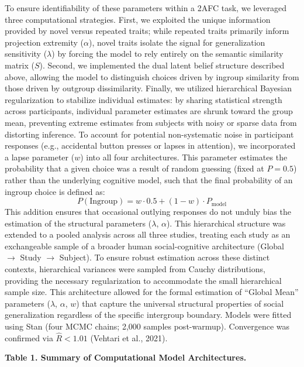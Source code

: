 \documentclass[
  man,
  longtable,
  nolmodern,
  notxfonts,
  notimes,
  man]{apa7}
\begin{document}
To ensure identifiability of these parameters within a 2AFC task, we
leveraged three computational strategies. First, we exploited the unique
information provided by novel versus repeated traits; while repeated
traits primarily inform projection extremity (\(\alpha\)), novel traits
isolate the signal for generalization sensitivity (\(\lambda\)) by
forcing the model to rely entirely on the semantic similarity matrix
(\(S\)). Second, we implemented the dual latent belief structure
described above, allowing the model to distinguish choices driven by
ingroup similarity from those driven by outgroup dissimilarity. Finally,
we utilized hierarchical Bayesian regularization to stabilize individual
estimates: by sharing statistical strength across participants,
individual parameter estimates are shrunk toward the group mean,
preventing extreme estimates from subjects with noisy or sparse data
from distorting inference. To account for potential non-systematic noise
in participant responses (e.g., accidental button presses or lapses in
attention), we incorporated a lapse parameter (\(w\)) into all four
architectures. This parameter estimates the probability that a given
choice was a result of random guessing (fixed at \(P = 0.5\)) rather
than the underlying cognitive model, such that the final probability of
an ingroup choice is defined as:
\[P(\text{Ingroup}) = w \cdot 0.5 + (1 - w) \cdot P_{\text{model}}\]
This addition ensures that occasional outlying responses do not unduly
bias the estimation of the structural parameters (\(\lambda\),
\(\alpha\)). This hierarchical structure was extended to a pooled
analysis across all three studies, treating each study as an
exchangeable sample of a broader human social-cognitive architecture
(Global \(\rightarrow\) Study \(\rightarrow\) Subject). To ensure robust
estimation across these distinct contexts, hierarchical variances were
sampled from Cauchy distributions, providing the necessary
regularization to accommodate the small hierarchical sample size. This
architecture allowed for the formal estimation of ``Global Mean''
parameters (\(\lambda\), \(\alpha\), \(w\)) that capture the universal
structural properties of social generalization regardless of the
specific intergroup boundary. Models were fitted using Stan (four MCMC
chains; 2,000 samples post-warmup). Convergence was confirmed via
\(\hat{R} < 1.01\) (Vehtari et al., 2021).

\textbf{Table 1. Summary of Computational Model Architectures.}
\end{document}

